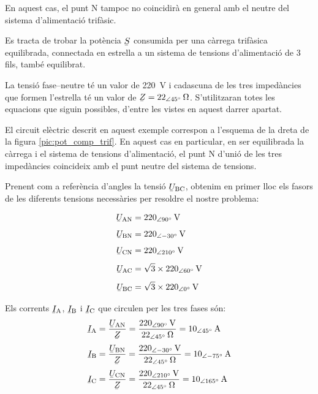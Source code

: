 En aquest cas, el punt N tampoc no coincidirà en general amb
el neutre del sistema d'alimentació trifàsic.
\begin{exemple}\label{ex:calc-pot}
    Es tracta de trobar la potència $\cmplx{S}$ consumida per una càrrega
    trifàsica equilibrada, connectada en estrella a un sistema de tensions
    d'alimentació  de 3 fils, també equilibrat.

    La tensió fase--neutre
    té un valor de \SI{220}{V} i cadascuna de les tres  impedàncies
    que formen l'estrella té un valor de $\cmplx{Z}=\SIpd{22}{45}{\ohm}$.
     S'utilitzaran totes les equacions que
    siguin possibles, d'entre les vistes en aquest darrer apartat.

    El circuit elèctric descrit en aquest exemple  correspon a
    l'esquema de la dreta de la figura \vref{pic:pot_comp_trif}. En
    aquest cas en particular, en ser equilibrada la càrrega i el
    sistema de tensions d'alimentació, el punt N d'unió de  les tres impedàncies coincideix amb el punt neutre del sistema de tensions.

    Prenent com a referència d'angles la tensió
    $\cmplx{U}\ped{BC}$, obtenim en primer lloc els fasors de
    les diferents tensions necessàries per resoldre el nostre
    problema:

    \hfill
    \begin{minipage}[b]{7.5cm}
        
    \end{minipage}
    \hfill
    \begin{minipage}[b][5.7cm][t]{3.8cm}
    \begin{align*}
        \cmplx{U}\ped{AN} &= \SIpd{220}{90}{V} \\[1ex]
        \cmplx{U}\ped{BN} &= \SIpd{220}{-30}{V} \\[1ex]
        \cmplx{U}\ped{CN} &= \SIpd{220}{210}{V} \\[1ex]
        \cmplx{U}\ped{AC} &= \sqrt{3}\times \SIpd{220}{60}{V} \\[1ex]
        \cmplx{U}\ped{BC} &= \sqrt{3}\times \SIpd{220}{0}{V}
    \end{align*}
    \end{minipage}
    \hfill{}

    Els corrents $\cmplx{I}\ped{A}$, $\cmplx{I}\ped{B}$ i $\cmplx{I}\ped{C}$ que
    circulen  per les tres fases són:
    \begin{align*}
        \cmplx{I}\ped{A} &=\frac{\cmplx{U}\ped{AN}}{\cmplx{Z}} =
        \frac{\SIpd{220}{90}{V}}{\SIpd{22}{45}{\ohm}} =
        \SIpd{10}{45}{A}\\[1mm]
        \cmplx{I}\ped{B} &=\frac{\cmplx{U}\ped{BN}}{\cmplx{Z}} =
        \frac{\SIpd{220}{-30}{V}}{\SIpd{22}{45}{\ohm}} =
        \SIpd{10}{-75}{A}\\[1mm]
        \cmplx{I}\ped{C} &=\frac{\cmplx{U}\ped{CN}}{\cmplx{Z}} =
        \frac{\SIpd{220}{210}{V}}{\SIpd{22}{45}{\ohm}} =
        \SIpd{10}{165}{A}
    \end{align*}



\end{exemple}
